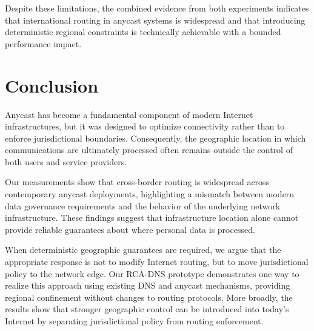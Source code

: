 \documentclass[acmsmall]{acmart}
\begin{document}
Despite these limitations, the combined evidence from both experiments indicates that international routing in anycast systems is widespread and that introducing deterministic regional constraints is technically achievable with a bounded performance impact.

\section{Conclusion}
\label{sec:conclusion}

Anycast has become a fundamental component of modern Internet infrastructures, but it was designed to optimize connectivity rather than to enforce jurisdictional boundaries. Consequently, the geographic location in which communications are ultimately processed often remains outside the control of both users and service providers.

Our measurements show that cross-border routing is widespread across contemporary anycast deployments, highlighting a mismatch between modern data governance requirements and the behavior of the underlying network infrastructure. These findings suggest that infrastructure location alone cannot provide reliable guarantees about where personal data is processed.

When deterministic geographic guarantees are required, we argue that the appropriate response is not to modify Internet routing, but to move jurisdictional policy to the network edge. Our RCA-DNS prototype demonstrates one way to realize this approach using existing DNS and anycast mechanisms, providing regional confinement without changes to routing protocols. More broadly, the results show that stronger geographic control can be introduced into today's Internet by separating jurisdictional policy from routing enforcement.




\end{document}
